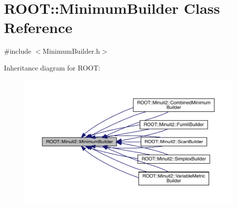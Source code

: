 \hypertarget{classROOT_1_1Minuit2_1_1MinimumBuilder}{}\section{R\+O\+OT\+:\+:Minimum\+Builder Class Reference}
\label{classROOT_1_1Minuit2_1_1MinimumBuilder}


{\ttfamily \#include $<$Minimum\+Builder.\+h$>$}



Inheritance diagram for R\+O\+OT\+:
\nopagebreak
\begin{figure}[H]
\begin{center}
\leavevmode
\includegraphics[width=350pt]{d1/d89/classROOT_1_1Minuit2_1_1MinimumBuilder__inherit__graph}
\end{center}
\end{figure}
